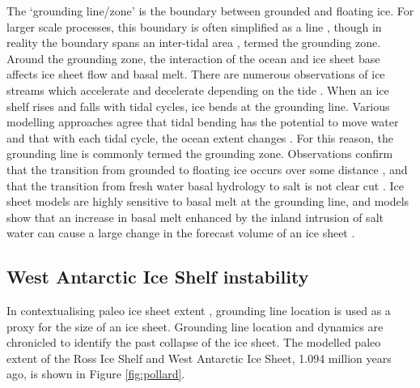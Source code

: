 The `grounding line/zone' is the boundary between grounded and floating ice. For larger scale processes, this boundary is often simplified as a line \citep[e.g][]{gudmundsson2013ice}, though in reality the boundary spans an inter-tidal area \citep[e.g][]{christianson2016basal}, termed the grounding zone. Around the grounding zone, the interaction of the ocean and ice sheet base affects ice sheet flow and basal melt.
There are numerous observations of ice streams which accelerate and decelerate depending on the tide \cite[e.g.][]{winberry2009basal,anandakrishnan2003ice}. 
When an ice shelf rises and falls with tidal cycles, ice bends at the grounding line. Various modelling approaches agree that tidal bending has the potential to move water and that with each tidal cycle, the ocean extent changes  \citep{sayag2013elastic,walker2013ice}. 
For this reason, the grounding line is commonly termed the grounding zone. Observations confirm that the transition from grounded to floating ice occurs over some distance \cite[e.g.][]{brunt2019assessment}, and that the transition from fresh water basal hydrology to salt is not clear cut \cite[e.g.][]{christianson2016basal}.
Ice sheet models are highly sensitive to basal melt at the grounding line, and models show that an increase in basal melt enhanced by the inland intrusion of salt water can cause a large change in the forecast volume of an ice sheet \citep{robel2022layered}.


\subsection{West Antarctic Ice Shelf instability}


In contextualising paleo ice sheet extent \cite[e.g][]{naish2009obliquity,pollard2009modelling}, grounding line location is used as a proxy for the size of an ice sheet. Grounding line location and dynamics are chronicled to identify the past collapse of the ice sheet. 
The modelled paleo extent of the Ross Ice Shelf and West Antarctic Ice Sheet, 1.094 million years ago, is shown in Figure \ref{fig:pollard}.

